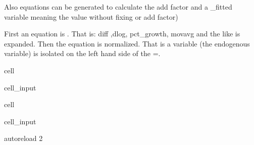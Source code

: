 \documentclass[letterpaper,10pt,english]{jupyterBook}
\begin{document}
\sphinxAtStartPar
Also equations can be generated to calculate the add factor and a \_fitted variable \sphinxhyphen{} meaning the value without fixing or add factor)

\sphinxAtStartPar
First an equation is . That is: diff ,dlog, pct\_growth, movavg and the like is expanded.
Then the equation is normalized. That is a variable (the endogenous variable) is isolated on the left hand side of the =.

\begin{sphinxuseclass}{cell}\begin{sphinxVerbatimInput}

\begin{sphinxuseclass}{cell_input}
\begin{sphinxVerbatim}[commandchars=\\\{\}]
   
\end{sphinxVerbatim}

\end{sphinxuseclass}\end{sphinxVerbatimInput}

\end{sphinxuseclass}
\begin{sphinxuseclass}{cell}\begin{sphinxVerbatimInput}

\begin{sphinxuseclass}{cell_input}
\begin{sphinxVerbatim}[commandchars=\\\{\}]
 autoreload
 2
\end{sphinxVerbatim}

\end{sphinxuseclass}\end{sphinxVerbatimInput}

\end{sphinxuseclass}
\end{document}
